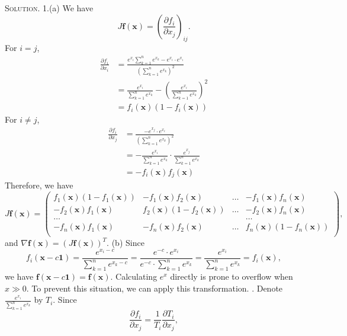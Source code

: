 \documentclass[12pt, a4paper, oneside]{ctexart}
\newenvironment{solution}{\par\noindent\textsc{Solution. }}{\\\par}
\begin{document}
\begin{solution}
	1.(a) We have
	\[
	J\mathbf{f(x)} = (\frac{\partial f_i}{\partial x_j})_{ij}.
	\] 
	For $i = j$, 
	\begin{align*}
		\frac{\partial f_i}{\partial x_i} & = \frac{e^{x_i}\sum_{k=1}^{n}e^{x_k} - e^{x_i} \cdot e^{x_i}}{(\sum_{k=1}^{n}e^{x_k})^2} \\
		& = \frac{e^{x_i}}{\sum_{k=1}^{n}e^{x_k}} - (\frac{e^{x_i}}{\sum_{k=1}^{n}e^{x_k}})^2 \\
		& = f_i(\mathbf{x})(1-f_i(\mathbf{x}))		
	\end{align*}
	For $i \neq j$,
	\begin{align*}
		\frac{\partial f_i}{\partial x_j} & = \frac{-e^{x_j} \cdot e^{x_i}}{(\sum_{k=1}^{n}e^{x_k})^2} \\
		& = -\frac{e^{x_i}}{\sum_{k=1}^{n}e^{x_k}} \cdot \frac{e^{x_j}}{\sum_{k=1}^{n}e^{x_k}} \\
		& = -f_i(\mathbf{x})f_j(\mathbf{x})	
	\end{align*}
	Therefore, we have
	\[
	J\mathbf{f(x)} =
	\begin{pmatrix}
	f_1(\mathbf{x})(1-f_1(\mathbf{x})) & -f_1(\mathbf{x})f_2(\mathbf{x}) & \dots & -f_1(\mathbf{x})f_n(\mathbf{x}) \\
	-f_2(\mathbf{x})f_1(\mathbf{x}) & f_2(\mathbf{x})(1-f_2(\mathbf{x})) & \dots & -f_2(\mathbf{x})f_n(\mathbf{x}) \\
	\dots & & & \dots \\
	-f_n(\mathbf{x})f_1(\mathbf{x}) & -f_n(\mathbf{x})f_2(\mathbf{x}) & \dots & f_n(\mathbf{x})(1-f_n(\mathbf{x})) \\
	\end{pmatrix},
	\]
	and $\nabla\mathbf{f(x)} = (J\mathbf{f(x)})^T$.
	\newline\newline
	(b) Since
	\[
	f_i(\mathbf{x}-c\mathbf{1}) = \frac{e^{x_i-c}}{\sum_{k=1}^{n}e^{x_k-c}} 
	= \frac{e^{-c} \cdot e^{x_i}}{e^{-c}\cdot\sum_{k=1}^{n}e^{x_k}} 
	= \frac{e^{x_i}}{\sum_{k=1}^{n}e^{x_k}} = f_i(\mathbf{x}),
	\]
	we have $\mathbf{f}(\mathbf{x}-c\mathbf{1}) = \mathbf{f}(\mathbf{x})$. \newline
	Calculating $e^x$ directly is prone to overflow when $x \gg 0$. To prevent this situation, we can apply this transformation.
	\newline{}. Denote $\frac{e^{x_i}}{\sum_{k=1}^{n}e^{x_k}}$ by $T_i$. Since
	\[
	\frac{\partial f_i}{\partial x_j} = \frac{1}{T_i} \frac{\partial T_i}{\partial x_j},
\]
\end{solution}
\end{document}
